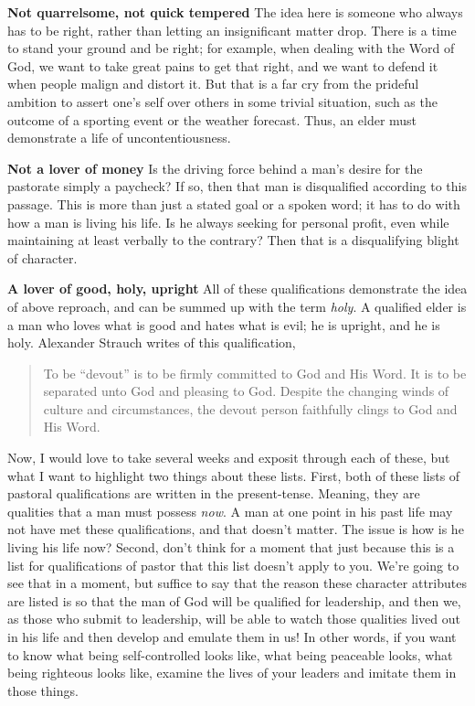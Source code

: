 \documentclass[letterpaper, 12pt]{article}
\begin{document}
    \textbf{Not quarrelsome, not quick tempered} The idea here is
    someone who always has to be right, rather than letting an
    insignificant matter drop.  There is a time to stand your ground
    and be right; for example, when dealing with the Word of God, we
    want to take great pains to get that right, and we want to
    defend it when people malign and distort it.  But that is a far
    cry from the prideful ambition to assert one's self over others
    in some trivial situation, such as the outcome of a sporting
    event or the weather forecast.  Thus, an elder must demonstrate
    a life of uncontentiousness.

    \textbf{Not a lover of money} Is the driving force behind a man's
    desire for the pastorate simply a paycheck?  If so, then that man
    is disqualified according to this passage.  This is more than just
    a stated goal or a spoken word; it has to do with how a man is
    living his life.  Is he always seeking for personal profit, even
    while maintaining at least verbally to the contrary?  Then that is
    a disqualifying blight of character.

    \textbf{A lover of good, holy, upright} All of these
    qualifications demonstrate the idea of above reproach, and can
    be summed up with the term \emph{holy}.  A qualified elder is a
    man who loves what is good and hates what is evil; he is
    upright, and he is holy. Alexander Strauch writes of this
    qualification,
    
    \begin{quote}

        To be ``devout'' is to be firmly committed to God and His Word.
        It is to be separated unto God and pleasing to God.  Despite the
        changing winds of culture and circumstances, the devout person
        faithfully clings to God and His Word.

    \end{quote}

    Now, I would love to take several weeks and exposit through each of
    these, but what I want to highlight two things about these
    lists. First, both of these lists of pastoral qualifications are
    written in the present-tense. Meaning, they are qualities that a man
    must possess \emph{now}. A man at one point in his past life may
    not have met these qualifications, and that doesn't matter. The
    issue is how is he living his life now? Second, don't think for a
    moment that just because this is a list for qualifications of pastor
    that this list doesn't apply to you. We're going to see that in a
    moment, but suffice to say that the reason these character
    attributes are listed is so that the man of God will be qualified
    for leadership, and then we, as those who submit to leadership, will
    be able to watch those qualities lived out in his life and then
    develop and emulate them in us! In other words, if you want to know
    what being self-controlled looks like, what being peaceable looks,
    what being righteous looks like, examine the lives of your leaders
    and imitate them in those things. \\
\end{document}
